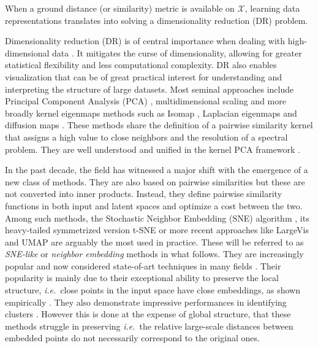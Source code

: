 When a ground distance (or similarity) metric is available on $\mathcal{X}$, learning data representations translates into solving a dimensionality reduction (DR) problem.


Dimensionality reduction (DR) is of central importance when dealing with high-dimensional data \citep{donoho2000high}. It mitigates the curse of dimensionality, allowing for greater statistical flexibility and less computational complexity. DR also enables visualization that can be of great practical interest for understanding and interpreting the structure of large datasets.
Most seminal approaches include Principal Component Analysis (PCA) \citep{pearson1901liii},  multidimensional scaling \citep{kruskal1978multidimensional} and more broadly kernel eigenmaps methods such as Isomap \citep{balasubramanian2002isomap}, Laplacian eigenmaps \citep{belkin2003laplacian} and diffusion maps \citep{coifman2006diffusion}. These methods share the definition of a pairwise similarity kernel that assigns a high value to close neighbors and the resolution of a spectral problem. They are well understood and unified in the kernel PCA framework \citep{ham2004kernel}.

In the past decade, the field has witnessed a major shift with the emergence of a new class of methods. They are also based on pairwise similarities but these are not converted into inner products. Instead, they define pairwise similarity functions in both input and latent spaces and optimize a cost between the two. Among such methods, the Stochastic Neighbor Embedding (SNE) algorithm \citep{NIPS2002SNE}, its heavy-tailed symmetrized version t-SNE \citep{maaten2008tSNE} or more recent approaches like LargeVis \citep{tang2016visualizing} and UMAP \citep{mcinnes2018umap} are arguably the most used in practice. These will be referred to as \textit{SNE-like} or \textit{neighbor embedding} methods in what follows. They are increasingly popular and now considered state-of-art techniques in many fields \citep{li2017application,kobak2019art,anders2018dissecting}. Their popularity is mainly due to their exceptional ability to preserve the local structure, \textit{i.e.}\ close points in the input space have close embeddings, as shown empirically \citep{wang2021understanding}. They also demonstrate impressive performances in identifying clusters \citep{arora2018analysis, linderman2019clustering}. However this is done at the expense of global structure, that these methods struggle in preserving \citep{wattenberg2016use, coenen2019understanding} \textit{i.e.}\ the relative large-scale distances between embedded points do not necessarily correspond to the original ones.

